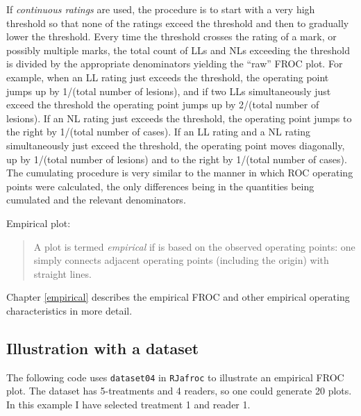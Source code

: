 \documentclass[
]{book}
\newenvironment{Shaded}{\begin{snugshade}}{\end{snugshade}}
\newcommand{\AttributeTok}[1]{\textcolor[rgb]{0.77,0.63,0.00}{#1}}
\newcommand{\DecValTok}[1]{\textcolor[rgb]{0.00,0.00,0.81}{#1}}
\newcommand{\FunctionTok}[1]{\textcolor[rgb]{0.00,0.00,0.00}{#1}}
\newcommand{\NormalTok}[1]{#1}
\newcommand{\OtherTok}[1]{\textcolor[rgb]{0.56,0.35,0.01}{#1}}
\newcommand{\SpecialCharTok}[1]{\textcolor[rgb]{0.00,0.00,0.00}{#1}}
\newcommand{\StringTok}[1]{\textcolor[rgb]{0.31,0.60,0.02}{#1}}
\begin{document}
If \emph{continuous ratings} are used, the procedure is to start with a very high threshold so that none of the ratings exceed the threshold and then to gradually lower the threshold. Every time the threshold crosses the rating of a mark, or possibly multiple marks, the total count of LLs and NLs exceeding the threshold is divided by the appropriate denominators yielding the ``raw'' FROC plot. For example, when an LL rating just exceeds the threshold, the operating point jumps up by 1/(total number of lesions), and if two LLs simultaneously just exceed the threshold the operating point jumps up by 2/(total number of lesions). If an NL rating just exceeds the threshold, the operating point jumps to the right by 1/(total number of cases). If an LL rating and a NL rating simultaneously just exceed the threshold, the operating point moves diagonally, up by 1/(total number of lesions) and to the right by 1/(total number of cases). The cumulating procedure is very similar to the manner in which ROC operating points were calculated, the only differences being in the quantities being cumulated and the relevant denominators.

Empirical plot:

\begin{quote}
A plot is termed \emph{empirical} if is based on the observed operating points: one simply connects adjacent operating points (including the origin) with straight lines.
\end{quote}

Chapter \ref{empirical} describes the empirical FROC and other empirical operating characteristics in more detail.

\hypertarget{froc-paradigm-plot-illustration}{%
\subsection{Illustration with a dataset}\label{froc-paradigm-plot-illustration}}

The following code uses \texttt{dataset04} \citep{zanca2009evaluation} in \texttt{RJafroc} to illustrate an empirical FROC plot. The dataset has 5-treatments and 4 readers, so one could generate 20 plots. In this example I have selected treatment 1 and reader 1.

\begin{Shaded}
\end{Shaded}
\end{document}
